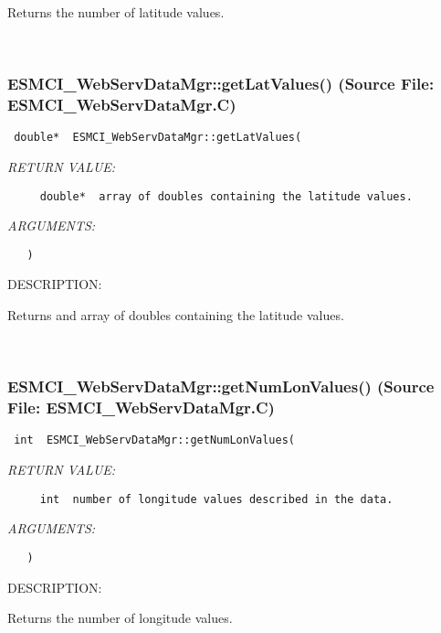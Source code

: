       Returns the number of latitude values.
   
 
\mbox{}\hrulefill\
 
\subsubsection{ESMCI\_WebServDataMgr::getLatValues() (Source File: ESMCI\_WebServDataMgr.C)}


  
\begin{verbatim} double*  ESMCI_WebServDataMgr::getLatValues(\end{verbatim}{\em RETURN VALUE:}
\begin{verbatim}     double*  array of doubles containing the latitude values.\end{verbatim}{\em ARGUMENTS:}
\begin{verbatim}   )\end{verbatim}
{\sf DESCRIPTION:\\ }


      Returns and array of doubles containing the latitude values.
   
 
\mbox{}\hrulefill\
 
\subsubsection{ESMCI\_WebServDataMgr::getNumLonValues() (Source File: ESMCI\_WebServDataMgr.C)}


  
\begin{verbatim} int  ESMCI_WebServDataMgr::getNumLonValues(\end{verbatim}{\em RETURN VALUE:}
\begin{verbatim}     int  number of longitude values described in the data.\end{verbatim}{\em ARGUMENTS:}
\begin{verbatim}   )\end{verbatim}
{\sf DESCRIPTION:\\ }


      Returns the number of longitude values.
   
 
